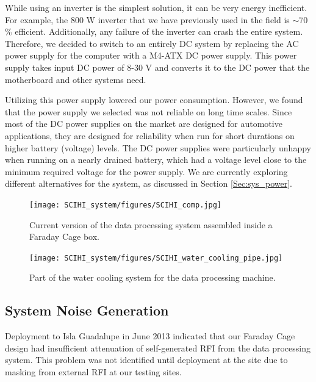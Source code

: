 While using an inverter is the simplest solution, it can be very energy inefficient. For example, the 800 W inverter that we have previously used in the field is $\sim70$\% efficient. Additionally, any failure of the inverter can crash the entire system. Therefore, we decided to switch to an entirely DC system by replacing the AC power supply for the computer with a M4-ATX DC power supply. This power supply takes input DC power of 8-30 V and converts it to the DC power that the motherboard and other systems need. 

Utilizing this power supply lowered our power consumption. However, we found that the power supply we selected was not reliable on long time scales. Since most of the DC power supplies on the market are designed for automotive applications, they are designed for reliability when run for short durations on higher battery (voltage) levels. The DC power supplies were particularly unhappy when running on a nearly drained battery, which had a voltage level close to the minimum required voltage for the power supply. We are currently exploring different alternatives for the system, as discussed in Section \ref{Sec:sys_power}. 

\begin{figure}[htb]
\centering
\begin{minipage}[b]{0.52\textwidth}
\centering
\texttt{[image: SCIHI\_system/figures/SCIHI\_comp.jpg]}
\caption{Current version of the data processing system assembled inside a Faraday Cage box.}
\label{Fig:new_comp}
\end{minipage}%
\begin{minipage}[b]{0.02\textwidth}
\hspace{1cm}
\end{minipage}%
\begin{minipage}[b]{0.42\textwidth}
\centering
\texttt{[image: SCIHI\_system/figures/SCIHI\_water\_cooling\_pipe.jpg]}
\caption{Part of the water cooling system for the data processing machine.}
\label{Fig:water_pipe}
\end{minipage}
\end{figure}

\subsection{System Noise Generation} \label{Sec:sys_noise}
Deployment to Isla Guadalupe in June 2013 indicated that our Faraday Cage design had insufficient attenuation of self-generated RFI from the data processing system. This problem was not identified until deployment at the site due to masking from external RFI at our testing sites. 

